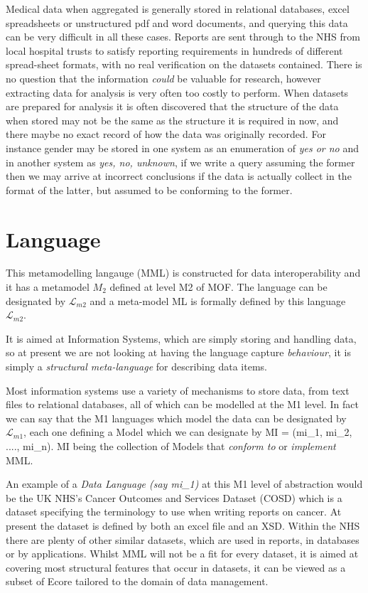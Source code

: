 \documentclass{llncs}
\newcommand{\Lagr}{\mathcal{L}}
\begin{document}
Medical data when aggregated is generally stored in relational databases, excel spreadsheets or unstructured pdf and word documents, and querying this data can be very difficult in all these cases. Reports are sent through to the NHS from local hospital trusts to satisfy reporting requirements in hundreds of different spread-sheet formats, with no real verification on the datasets contained. There is no question that the information \emph{could} be valuable for research, however extracting data for analysis is very often too costly to perform.  When datasets are prepared for analysis it is often discovered that the structure of the data when stored may not be the same as the structure it is required in now, and there maybe no exact record of how the data was originally recorded. For instance gender may be stored in one system as an enumeration of \emph{yes or no} and in another system as \emph{yes, no, unknown}, if we write a query assuming the former then we may arrive at incorrect conclusions if the data is actually collect in the format of the latter, but assumed to be conforming to the former. 

\section{Language}

This metamodelling langauge (MML) is constructed for data interoperability and it has a metamodel \textbf{$M_2$} defined at level M2 of MOF. The language can be designated by $\Lagr_{m2}$ and a meta-model ML is formally defined by this language $\Lagr_{m2}$.

It is aimed at Information Systems, which are simply storing and handling data, so at present we are not looking at having the language capture \emph{behaviour}, it is simply a \emph{structural meta-language} for describing data items. 

Most information systems use a variety of mechanisms to store data, from text files to relational databases, all of which can be modelled at the M1 level.  In fact we can say that the M1 languages which model the data can be designated by $\Lagr_{m1}$, each one defining a Model which we can designate by MI = (mi\_1, mi\_2, ...., mi\_n).  MI being the collection of Models that \emph{conform to} or \emph{implement} MML.  

An example of a \emph{Data Language (say mi\_1)} at this M1 level of abstraction would be the UK NHS's Cancer Outcomes and Services Dataset (COSD) which is a dataset specifying the terminology to use when writing reports on cancer. At present the dataset is defined by both an excel file and an XSD.  Within the NHS there are plenty of other similar datasets, which are used in reports, in databases or by applications.  Whilst MML will not be a fit for every dataset, it is aimed at covering most structural features that occur in datasets, it can be viewed as a subset of Ecore tailored to the domain of data management.
\end{document}
